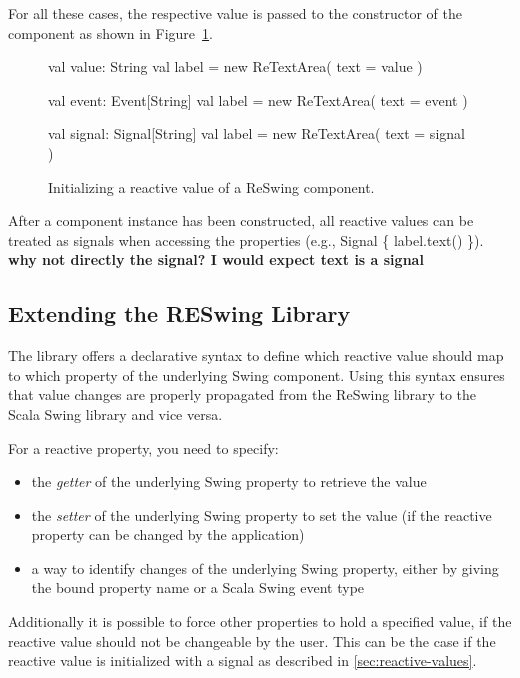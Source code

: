 \documentclass{scrartcl}
\newcommand{\code}[1]{{\fontfamily{cmtt}\small\selectfont#1}}
\begin{document}
For all these cases, the respective value is passed to the constructor
of the component as shown in
Figure~\ref{lst:initializing-reactive-values}.

\begin{figure}[h]
\begin{codenv}
val value: String
val label = new ReTextArea(
    text = value 
)

val event: Event[String]
val label = new ReTextArea(
    text = event
)

val signal: Signal[String] 
val label = new ReTextArea( 
    text = signal 
)
\end{codenv}
\caption{Initializing a reactive value of a ReSwing component.}
\label{lst:initializing-reactive-values}
\end{figure}


After a component instance has been constructed, all reactive values
can be treated as signals when accessing the properties (e.g.,
\code{Signal \{ label.text() \}}). {\bf why not directly the signal? I
  would expect text is a signal}



\subsection{Extending the RESwing Library}
\label{sec:defining-reactive-values}
The library offers a declarative syntax to define which reactive value
should map to which property of the underlying Swing component. Using
this syntax ensures that value changes are properly propagated from
the ReSwing library to the Scala Swing library and vice versa.

For a reactive property, you need to specify:
\begin{itemize}
\item the \emph{getter} of the underlying Swing property to retrieve the value
\item the \emph{setter} of the underlying Swing property to set the
  value (if the reactive property can be changed by the application)
\item a way to identify changes of the underlying Swing property,
  either by giving the bound property name or a Scala Swing event type
\end{itemize}
Additionally it is possible to force other properties to hold a
specified value, if the reactive value should not be changeable by the
user. This can be the case if the reactive value is initialized with a
signal as described in \ref{sec:reactive-values}.
\end{document}
